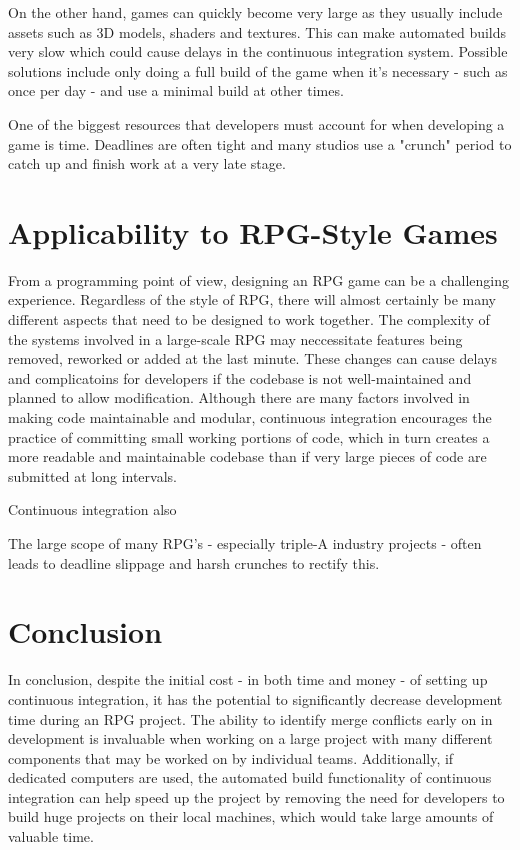 \documentclass{scrartcl}
\begin{document}
On the other hand, games can quickly become very large as they usually include assets such as 3D models, shaders and textures. This can make automated builds very slow which could cause delays in the continuous integration system. Possible solutions include only doing a full build of the game when it's necessary - such as once per day - and use a minimal build at other times.

One of the biggest resources that developers must account for when developing a game is time. Deadlines are often tight and many studios use a "crunch" period to catch up and finish work at a very late stage. 


\section{Applicability to RPG-Style Games}

From a programming point of view, designing an RPG game can be a challenging experience. Regardless of the style of RPG, there will almost certainly be many different aspects that need to be designed to work together. The complexity of the systems involved in a large-scale RPG may neccessitate features being removed, reworked or added at the last minute. These changes can cause delays and complicatoins for developers if the codebase is not well-maintained and planned to allow modification. Although there are many factors involved in making code maintainable and modular, continuous integration encourages the practice of committing small working portions of code, which in turn creates a more readable and maintainable codebase than if very large pieces of code are submitted at long intervals.

Continuous integration also  

The large scope of many RPG's - especially triple-A industry projects - often leads to deadline slippage and harsh crunches to rectify this. 


\section{Conclusion}

In conclusion, despite the initial cost - in both time and money - of setting up continuous integration, it has the potential to significantly decrease development time during an RPG project. The ability to identify merge conflicts early on in development is invaluable when working on a large project with many different components that may be worked on by individual teams. Additionally, if dedicated computers are used, the automated build functionality of continuous integration can help speed up the project by removing the need for developers to build huge projects on their local machines, which would take large amounts of valuable time. \cite{gamasutraCIprocess}
\end{document}
